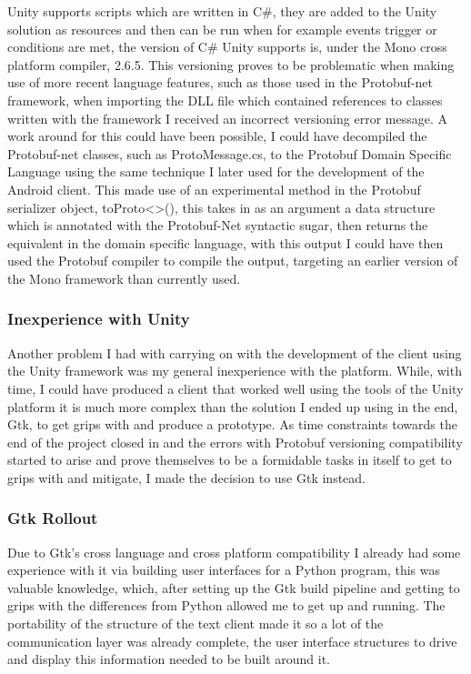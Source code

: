 \documentclass{article}
\begin{document}
Unity supports scripts which are written in C\#, they are added to the Unity solution as resources and then can be run when for example events trigger or conditions are met, the version of C\# Unity supports is, under the Mono cross platform compiler, 2.6.5. This versioning proves to be problematic when making use of more recent language features, such as those used in the Protobuf-net framework, when importing the DLL file which contained references to classes written with the framework I received an incorrect versioning error message. A work around for this could have been possible, I could have decompiled the Protobuf-net classes, such as ProtoMessage.cs, to the Protobuf Domain Specific Language using the same technique I later used for the development of the Android client. This made use of an experimental method in the Protobuf serializer object, toProto<>(), this takes in as an argument a data structure which is annotated with the Protobuf-Net syntactic sugar, then returns the equivalent in the domain specific language, with this output I could have then used the Protobuf compiler to compile the output, targeting an earlier version of the Mono framework than currently used.

\subsubsection{Inexperience with Unity}

Another problem I had with carrying on with the development of the client using the Unity framework was my general inexperience with the platform. While, with time, I could have produced a client that worked well using the tools of the Unity platform it is much more complex than the solution I ended up using in the end, Gtk, to get grips with and produce a prototype. As time constraints towards the end of the project closed in and the errors with Protobuf versioning compatibility started to arise and prove themselves to be a formidable tasks in itself to get to grips with and mitigate, I made the decision to use Gtk instead.

\subsubsection{Gtk Rollout}

Due to Gtk’s cross language and cross platform compatibility I already had some experience with it via building user interfaces for a Python program, this was valuable knowledge, which, after setting up the Gtk build pipeline and getting to grips with the differences from Python allowed me to get up and running. The portability of the structure of the text client made it so a lot of the communication layer was already complete, the user interface structures to drive and display this information needed to be built around it.
\end{document}
